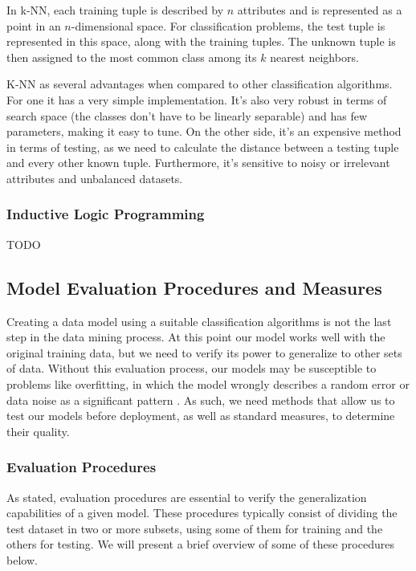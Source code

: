 In k-NN, each training tuple is described by $n$ attributes and is represented
as a point in an $n$-dimensional space. For classification problems, the test
tuple is represented in this space, along with the training tuples. The unknown
tuple is then assigned to the most common class among its $k$ nearest neighbors.

K-NN as several advantages when compared to other classification algorithms. For
one it has a very simple implementation. It's also very robust in terms of
search space (the classes don't have to be linearly separable) and has few
parameters, making it easy to tune. On the other side, it's an expensive method
in terms of testing, as we need to calculate the distance between a testing
tuple and every other known tuple. Furthermore, it's sensitive to noisy or
irrelevant attributes and unbalanced datasets.

\subsubsection*{Inductive Logic Programming}

TODO\\

\subsection{Model Evaluation Procedures and Measures}

Creating a data model using a suitable classification algorithms is not the last
step in the data mining process. At this point our model works well with the
original training data, but we need to verify its power to generalize to other
sets of data. Without this evaluation process, our models may be susceptible to
problems like overfitting, in which the model wrongly describes a random error
or data noise as a significant pattern \cite{han2006data}. As such, we need
methods that allow us to test our models before deployment, as well as standard
measures, to determine their quality.

\subsubsection*{Evaluation Procedures}

As stated, evaluation procedures are essential to verify the generalization
capabilities of a given model. These procedures typically consist of dividing
the test dataset in two or more subsets, using some of them for training and the
others for testing. We will present a brief overview of some of these procedures
below.

